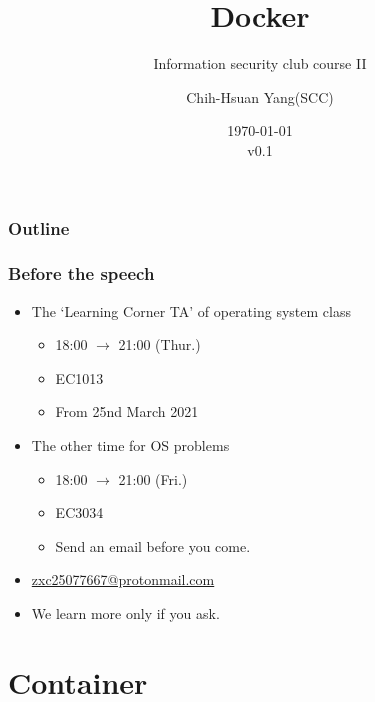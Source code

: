 \documentclass{beamer}
\title{Docker}
\subtitle{Information security club course \RN{2}}
\author{Chih-Hsuan Yang(SCC)}
\institute{National Sun Yat-sen University}
\date{\today\\v0.1}
\begin{document}
\begin{frame}
    \titlepage
\end{frame}

\begin{frame}
    \frametitle{Outline}
    \begin{multicols}{2}
        \tableofcontents
    \end{multicols}
\end{frame}

\begin{frame}
    \frametitle{Before the speech}
    \begin{itemize}
        \item The `Learning Corner TA' of operating system class
              \begin{itemize}
                  \item 18:00 $\to$ 21:00 (Thur.)
                  \item EC1013
                  \item From 25nd March 2021
              \end{itemize}
        \item The other time for OS problems
              \begin{itemize}
                  \item 18:00 $\to$ 21:00 (Fri.)
                  \item EC3034
                  \item Send an email before you come.
              \end{itemize}
        \item {\color{blue}\href{mailto::zxc25077667@protonmail.com}{zxc25077667@protonmail.com}}
        \item We learn more only if you ask.
    \end{itemize}
\end{frame}

\section{Container}
\end{document}
